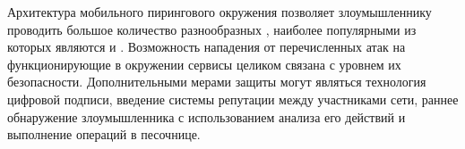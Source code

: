 %
Архитектура мобильного пирингового окружения позволяет злоумышленнику проводить большое количество разнообразных , наиболее популярными из которых являются  и . 
%
Возможность  нападения от перечисленных атак на функционирующие в окружении сервисы целиком связана с уровнем их безопасности. 
%
Дополнительными мерами защиты могут являться технология цифровой подписи, введение системы репутации между участниками сети, раннее обнаружение злоумышленника с использованием анализа его действий и выполнение операций в песочнице.